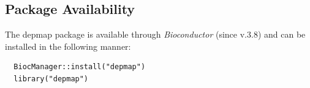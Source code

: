 \documentclass{article}
\newcommand{\hcode}[2][lgray]{{\ttfamily\color{vdgray}\colorbox{#1}{#2}}}
\begin{document}
\begin{multicols}{2}
\begin{minipage}[t]{\linewidth}
% 
\vspace{0.3cm}
  \subsection*{Package Availability}
  \large
  The \hcode{depmap} package is available through \textit{Bioconductor} (since v.3.8) and can be installed in the following manner:
  \begin{lstlisting}
  BiocManager::install("depmap")
  library("depmap")
  \end{lstlisting}
    \vspace{0.3cm}
\end{minipage}

\scriptsize
 


\end{multicols}
\end{document}
